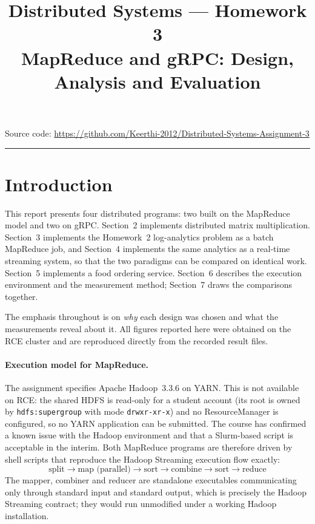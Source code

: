 \documentclass[11pt,a4paper]{article}
\title{\vspace{-1.6cm}\textbf{Distributed Systems --- Homework 3}\\[0.35em]
\large MapReduce and gRPC: Design, Analysis and Evaluation}
\author{}\date{}
\begin{document}
\maketitle\vspace{-1.6cm}

\begin{center}\small
Source code: \url{https://github.com/Keerthi-2012/Distributed-Systems-Assignment-3}
\end{center}

\vspace{0.4em}
{\small\tableofcontents}
\vspace{0.6em}
\hrule

\section{Introduction}

This report presents four distributed programs: two built on the MapReduce model and
two on gRPC. Section~2 implements distributed matrix multiplication. Section~3
implements the Homework~2 log-analytics problem as a batch MapReduce job, and
Section~4 implements the same analytics as a real-time streaming system, so that the
two paradigms can be compared on identical work. Section~5 implements a food ordering
service. Section~6 describes the execution environment and the measurement method;
Section~7 draws the comparisons together.

The emphasis throughout is on \emph{why} each design was chosen and what the
measurements reveal about it. All figures reported here were obtained on the RCE
cluster and are reproduced directly from the recorded result files.

\paragraph{Execution model for MapReduce.}
The assignment specifies Apache Hadoop~3.3.6 on YARN. This is not available on RCE:
the shared HDFS is read-only for a student account (its root is owned by
\texttt{hdfs:supergroup} with mode \texttt{drwxr-xr-x}) and no ResourceManager is
configured, so no YARN application can be submitted. The course has confirmed a known
issue with the Hadoop environment and that a Slurm-based script is acceptable in the
interim. Both MapReduce programs are therefore driven by shell scripts that reproduce
the Hadoop Streaming execution flow exactly:
\[
\text{split} \rightarrow \text{map (parallel)} \rightarrow \text{sort} \rightarrow
\text{combine} \rightarrow \text{sort} \rightarrow \text{reduce}
\]
The mapper, combiner and reducer are standalone executables communicating only through
standard input and standard output, which is precisely the Hadoop Streaming contract;
they would run unmodified under a working Hadoop installation.
\end{document}
